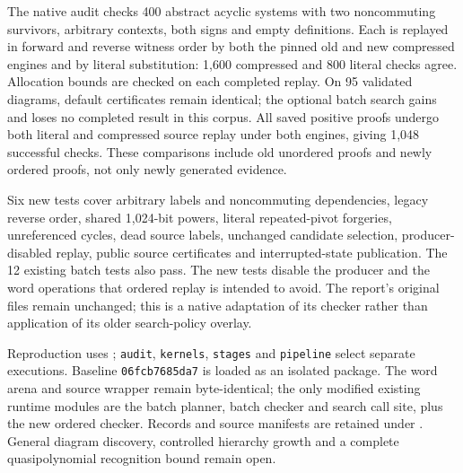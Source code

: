 The native audit checks 400 abstract acyclic systems with two noncommuting
survivors, arbitrary contexts, both signs and empty definitions. Each is
replayed in forward and reverse witness order by both the pinned old and new
compressed engines and by literal substitution: 1,600 compressed and 800
literal checks agree. Allocation bounds are checked on each completed replay.
On 95 validated diagrams, default certificates remain identical; the optional
batch search gains and loses no completed result in this corpus. All saved
positive proofs undergo both literal and compressed source replay under both
engines, giving 1,048 successful checks. These comparisons include old
unordered proofs and newly ordered proofs, not only newly generated evidence.

Six new tests cover arbitrary labels and noncommuting dependencies, legacy
reverse order, shared 1,024-bit powers, literal repeated-pivot forgeries,
unreferenced cycles, dead source labels, unchanged candidate selection,
producer-disabled replay, public source certificates and interrupted-state
publication. The 12 existing batch tests also pass. The new tests disable the
producer and the word operations that ordered replay is intended to avoid.
The report's original files remain unchanged; this is a native adaptation of
its checker rather than application of its older search-policy overlay.



Reproduction uses ;
\texttt{audit}, \texttt{kernels}, \texttt{stages} and \texttt{pipeline} select
separate executions. Baseline \texttt{06fcb7685da7} is loaded as an isolated
package. The word arena and source wrapper remain byte-identical; the only
modified existing runtime modules are the batch planner, batch checker and
search call site, plus the new ordered checker. Records and source manifests
are retained under . General diagram discovery,
controlled hierarchy growth and a complete quasipolynomial recognition bound
remain open.
